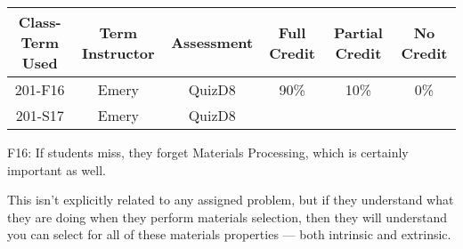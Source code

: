 \begin{outcomes}
	\begin{center}
		\begin{tabular}{cccccc}
			\hline\hline
			Class-Term Used & Term Instructor & Assessment & Full Credit & Partial Credit & No Credit\\
			\hline
			201-F16 & Emery & QuizD8 & 90\% & 10\% & 0\%\\
			201-S17 & Emery & QuizD8 &      &      &  \\
			\hline
		\end{tabular}
	\end{center}
\end{outcomes}

\begin{comments}
F16: If students miss, they forget Materials Processing, which is certainly important as well.

This isn't explicitly related to any assigned problem, but if they understand what they are doing when they perform materials selection, then they will understand you can select for all of these materials properties --- both intrinsic and extrinsic.

\end{comments}